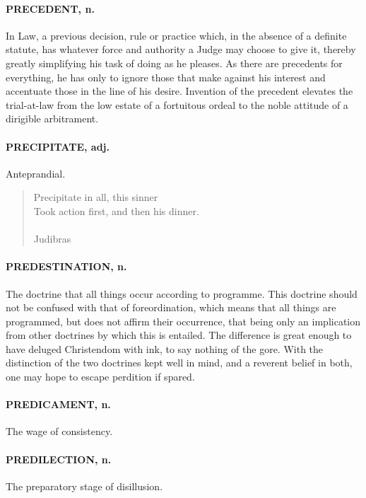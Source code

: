 \documentclass[11pt]{article}
\begin{document}
\paragraph{PRECEDENT, n.}  In Law, a previous decision, rule or practice which, in
the absence of a definite statute, has whatever force and authority a
Judge may choose to give it, thereby greatly simplifying his task of
doing as he pleases.  As there are precedents for everything, he has
only to ignore those that make against his interest and accentuate
those in the line of his desire.  Invention of the precedent elevates
the trial-at-law from the low estate of a fortuitous ordeal to the
noble attitude of a dirigible arbitrament.

\paragraph{PRECIPITATE, adj.}  Anteprandial.

\begin{quote}   Precipitate in all, this sinner \\
  Took action first, and then his dinner. \\
 \\
Judibras \end{quote}


\paragraph{PREDESTINATION, n.}  The doctrine that all things occur according to
programme.  This doctrine should not be confused with that of
foreordination, which means that all things are programmed, but does
not affirm their occurrence, that being only an implication from other
doctrines by which this is entailed.  The difference is great enough
to have deluged Christendom with ink, to say nothing of the gore.
With the distinction of the two doctrines kept well in mind, and a
reverent belief in both, one may hope to escape perdition if spared.

\paragraph{PREDICAMENT, n.}  The wage of consistency.

\paragraph{PREDILECTION, n.}  The preparatory stage of disillusion.
\end{document}
